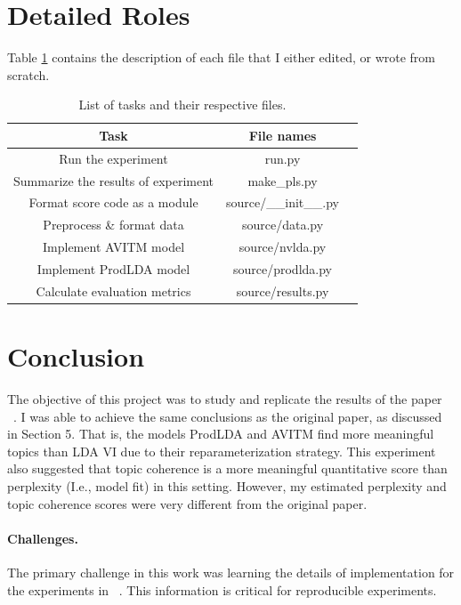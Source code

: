 \documentclass[10pt,twocolumn,letterpaper]{article}
\begin{document}

\section{Detailed Roles}
\noindent
Table \ref{tab:roles} contains the description of each file that I either edited, or wrote from scratch.
\begin{table}\label{tab:roles}
\centering
\begin{tabular}{ |c|c|c| } 
\hline
\textbf{Task} & \textbf{File names} \\
\hline
Run the experiment & run.py  \\ 
Summarize the results of experiment & make\_pls.py  \\ 
Format score code as a module & source/\_\_init\_\_.py \\
Preprocess \& format data & source/data.py \\
Implement AVITM model & source/nvlda.py \\
Implement ProdLDA model & source/prodlda.py \\
Calculate evaluation metrics & source/results.py \\
\hline
\end{tabular}
\caption{List of tasks and their respective files.}
\end{table}

\section{Conclusion}
The objective of this project was to study and replicate the results of the paper ~\cite{srivastava2017autoencoding}.
I was able to achieve the same conclusions as the original paper, as discussed in Section 5.
That is, the models ProdLDA and AVITM find more meaningful topics than LDA VI due to their reparameterization strategy.
This experiment also suggested that topic coherence is a more meaningful quantitative score than perplexity (I.e., model fit) in this setting.
However, my estimated perplexity and topic coherence scores were very different from the original paper.

\paragraph{Challenges.}
The primary challenge in this work was learning the details of implementation for the experiments in ~\cite{srivastava2017autoencoding}.
This information is critical for reproducible experiments.
\end{document}
